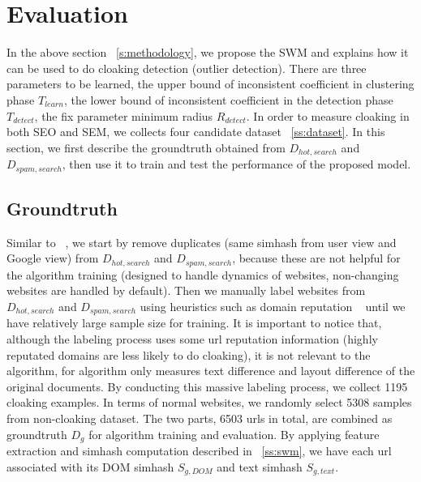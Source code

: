 \section{Evaluation}
\label{s:evaluation}



In the above section ~\autoref{s:methodology}, we propose the SWM and explains
how it can be used to do cloaking detection (outlier detection). There are three
parameters to be learned, the upper bound of inconsistent coefficient in
clustering phase $T_{learn}$, the lower bound of inconsistent coefficient in the detection
phase $T_{detect}$, the fix parameter minimum radius $R_{detect}$. 
In order to measure cloaking in both SEO and SEM, we collects four candidate dataset
~\autoref{ss:dataset}. In this section,
we first describe the groundtruth obtained from $D_{hot, search}$ and $D_{spam,
search}$, then use it to train and test the performance of the proposed model.

\subsection{Groundtruth}

Similar to ~\cite{lin2009detection}, we start by remove duplicates (same simhash
from user view and Google view) from $D_{hot, search}$ and $D_{spam, search}$,
because these are not helpful for the algorithm training (designed to handle
dynamics of websites, non-changing websites are handled by default). Then we
manually label websites from $D_{hot, search}$ and $D_{spam, search}$ using
heuristics such as domain reputation ~\cite{wot} until we
have relatively large sample size for training. 
It is important to notice that, although the labeling process uses some url
reputation information (highly reputated domains are less likely to do cloaking),
it is not relevant to the algorithm, for algorithm only measures text difference
and layout difference of the original documents.
By conducting this massive
labeling process, we collect 1195 cloaking examples. In terms of normal websites, we randomly
select 5308 samples from non-cloaking dataset. The two parts, 6503 urls in
total, are combined as groundtruth $D_{g}$ for algorithm training and evaluation.
By applying feature extraction and simhash computation described in
~\autoref{ss:swm}, we have each url associated with its DOM simhash $S_{g, DOM}$ 
and text simhash $S_{g, text}$.

